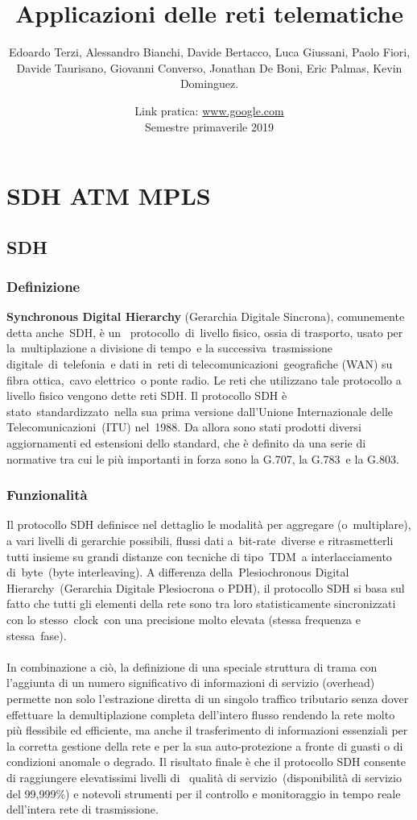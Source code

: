 \documentclass[8pt]{extarticle}
\title{\Huge Applicazioni delle reti telematiche \vspace{1cm}}
\author{Edoardo Terzi, Alessandro Bianchi, Davide Bertacco, Luca Giussani, Paolo Fiori, \\
Davide Taurisano, Giovanni Converso, Jonathan De Boni, Eric Palmas, Kevin Dominguez.\vspace{0.5cm}}
\date{Link pratica: \url{www.google.com} \\ Semestre primaverile 2019}
\begin{document}
\maketitle
\thispagestyle{empty}
\pagebreak

\tableofcontents
\lstset{language=C++}
\pagebreak

\section{SDH ATM MPLS}
\subsection{SDH}
\subsubsection{Definizione}
\noindent
\textbf{Synchronous Digital Hierarchy} (Gerarchia Digitale Sincrona), comunemente detta anche SDH, è un 
protocollo di livello fisico, ossia di trasporto, usato per la multiplazione a divisione di tempo e la 
successiva trasmissione digitale di telefonia e dati in reti di telecomunicazioni geografiche (WAN) su 
fibra ottica, cavo elettrico o ponte radio. Le reti che utilizzano tale protocollo a livello fisico 
vengono dette reti SDH. Il protocollo SDH è stato standardizzato nella sua prima versione dall'Unione 
Internazionale delle Telecomunicazioni (ITU) nel 1988. Da allora sono stati prodotti diversi aggiornamenti 
ed estensioni dello standard, che è definito da una serie di normative tra cui le più importanti in forza 
sono la G.707, la G.783 e la G.803.
\subsubsection{Funzionalità}
\noindent
Il protocollo SDH definisce nel dettaglio le modalità per aggregare (o multiplare), a vari livelli di 
gerarchie possibili, flussi dati a bit-rate diverse e ritrasmetterli tutti insieme su grandi distanze 
con tecniche di tipo TDM a interlacciamento di byte (byte interleaving). A differenza della Plesiochronous 
Digital Hierarchy (Gerarchia Digitale Plesiocrona o PDH), il protocollo SDH si basa sul fatto che tutti 
gli elementi della rete sono tra loro statisticamente sincronizzati con lo stesso clock con una precisione 
molto elevata (stessa frequenza e stessa fase).\\\\
In combinazione a ciò, la definizione di una speciale struttura di trama con l'aggiunta di un numero 
significativo di informazioni di servizio (overhead) permette non solo l'estrazione diretta di un singolo 
traffico tributario senza dover effettuare la demultiplazione completa dell'intero flusso rendendo la 
rete molto più flessibile ed efficiente, ma anche il trasferimento di informazioni essenziali per la 
corretta gestione della rete e per la sua auto-protezione a fronte di guasti o di condizioni anomale o 
degrado. Il risultato finale è che il protocollo SDH consente di raggiungere elevatissimi livelli di 
qualità di servizio (disponibilità di servizio del 99,999\%) e notevoli strumenti per il controllo e 
monitoraggio in tempo reale dell'intera rete di trasmissione.
\end{document}
